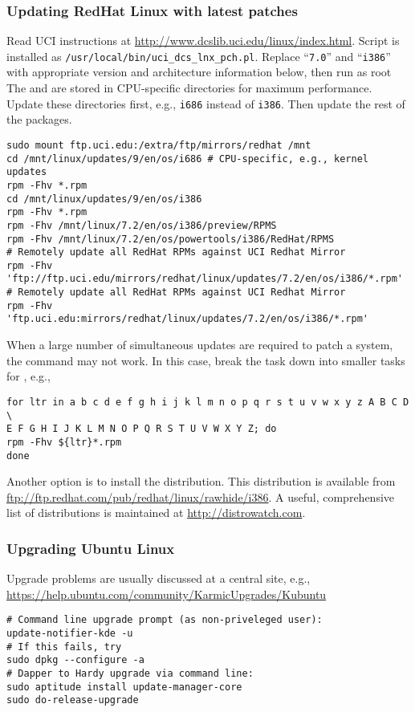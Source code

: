 \documentclass[12pt,twoside]{article}
\begin{document}
\subsubsection{Updating RedHat Linux with latest patches}\label{sxn:rhl2}
Read UCI instructions at
\url{http://www.dcslib.uci.edu/linux/index.html}.
Script is installed as \verb'/usr/local/bin/uci_dcs_lnx_pch.pl'.
Replace ``\verb'7.0''' and ``\verb'i386''' with appropriate version
and architecture information below, then run as root
The  and  are stored in 
CPU-specific directories for maximum performance.
Update these directories first, e.g., \verb'i686' instead of \verb'i386'. 
Then update the rest of the packages.
\begin{verbatim}
sudo mount ftp.uci.edu:/extra/ftp/mirrors/redhat /mnt
cd /mnt/linux/updates/9/en/os/i686 # CPU-specific, e.g., kernel updates
rpm -Fhv *.rpm
cd /mnt/linux/updates/9/en/os/i386
rpm -Fhv *.rpm
rpm -Fhv /mnt/linux/7.2/en/os/i386/preview/RPMS
rpm -Fhv /mnt/linux/7.2/en/os/powertools/i386/RedHat/RPMS
# Remotely update all RedHat RPMs against UCI Redhat Mirror
rpm -Fhv 'ftp://ftp.uci.edu/mirrors/redhat/linux/updates/7.2/en/os/i386/*.rpm' 
# Remotely update all RedHat RPMs against UCI Redhat Mirror
rpm -Fhv 'ftp.uci.edu:mirrors/redhat/linux/updates/7.2/en/os/i386/*.rpm'
\end{verbatim}
When a large number of simultaneous updates are required to patch a
system, the command  may not work.
In this case, break the task down into smaller tasks for ,
e.g., 
\begin{verbatim}
for ltr in a b c d e f g h i j k l m n o p q r s t u v w x y z A B C D \
E F G H I J K L M N O P Q R S T U V W X Y Z; do
rpm -Fhv ${ltr}*.rpm
done
\end{verbatim}
Another option is to install the  
distribution. 
This distribution is available from
\url{ftp://ftp.redhat.com/pub/redhat/linux/rawhide/i386}.
A useful, comprehensive list of distributions is maintained at
\url{http://distrowatch.com}.

\subsubsection{Upgrading Ubuntu Linux}\label{sxn:ubn}
Upgrade problems are usually discussed at a central site, e.g., 
\url{https://help.ubuntu.com/community/KarmicUpgrades/Kubuntu}
\begin{verbatim}
# Command line upgrade prompt (as non-priveleged user):
update-notifier-kde -u
# If this fails, try
sudo dpkg --configure -a
# Dapper to Hardy upgrade via command line:
sudo aptitude install update-manager-core
sudo do-release-upgrade
\end{verbatim}
\end{document}
